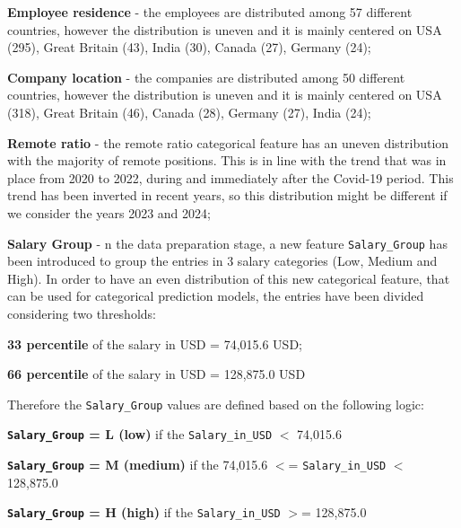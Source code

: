 \documentclass[11pt,a4paper]{article}
\newcommand{\SubItem}[1]{
  {\setlength\itemindent{13pt} \item[◦] #1}
}
\newcommand{\SubSubItem}[1]{
  {\setlength\itemindent{26pt} \item[◦] #1}
}
\begin{document}
\begin{itemize}
\SubItem{\textbf{Employee residence} - the employees are distributed among 57 different countries, however the distribution is uneven and it is mainly centered on USA (295), Great Britain (43), India (30), Canada (27), Germany (24);}
\SubItem{\textbf{Company location} - the companies are distributed among 50 different countries, however the distribution is uneven and it is mainly centered on USA (318), Great Britain (46), Canada (28), Germany (27), India (24);}
\SubItem{\textbf{Remote ratio} - the remote ratio categorical feature has an uneven distribution with the majority of remote positions. This is in line with the trend that was in place from 2020 to 2022, during and immediately after the Covid-19 period. This trend has been inverted in recent years, so this distribution might be different if we consider the years 2023 and 2024;}
\SubItem{\textbf{Salary Group} - n the data preparation stage, a new feature \texttt{Salary\_Group} has been introduced to group the entries in 3 salary categories (Low, Medium and High). In order to have an even distribution of this new categorical feature, that can be used for categorical prediction models, the entries have been divided considering two thresholds:}
\SubSubItem{\textbf{33 percentile} of the salary in USD = 74,015.6 USD;}
\SubSubItem{\textbf{66 percentile} of the salary in USD = 128,875.0 USD}
Therefore the \texttt{Salary\_Group} values are defined based on the following logic:
\SubSubItem{\textbf{\texttt{Salary\_Group} = L (low)} if the \texttt{Salary\_in\_USD} $<$ 74,015.6}
\SubSubItem{\textbf{\texttt{Salary\_Group} = M (medium)}  if the 74,015.6 $<$= \texttt{Salary\_in\_USD} $<$  128,875.0}
\SubSubItem{\textbf{\texttt{Salary\_Group} = H (high)} if the \texttt{Salary\_in\_USD} $>$= 128,875.0}
\end{itemize}
\end{document}
